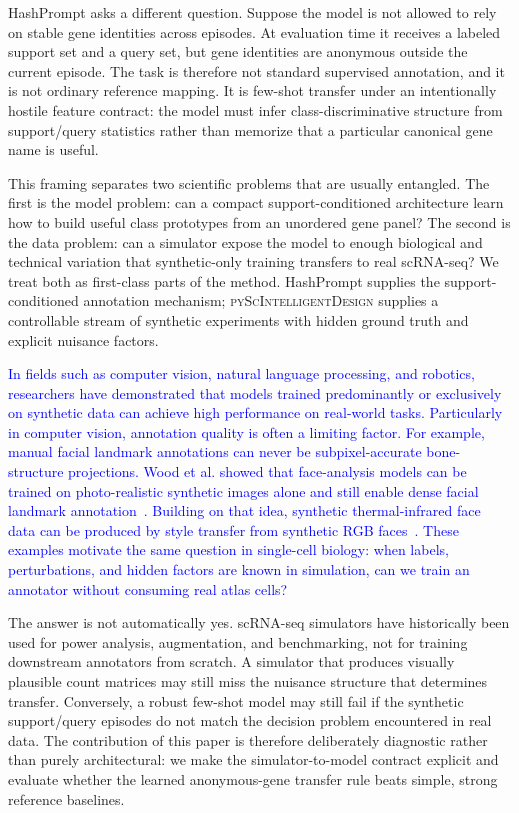 \documentclass{article}
\newcommand{\phflo}[1]{\textcolor{blue}{#1}}
\begin{document}
HashPrompt asks a different question. Suppose the model is not allowed to rely on stable gene identities across episodes. At evaluation time it receives a labeled support set and a query set, but gene identities are anonymous outside the current episode. The task is therefore not standard supervised annotation, and it is not ordinary reference mapping. It is few-shot transfer under an intentionally hostile feature contract: the model must infer class-discriminative structure from support/query statistics rather than memorize that a particular canonical gene name is useful.

This framing separates two scientific problems that are usually entangled. The first is the model problem: can a compact support-conditioned architecture learn how to build useful class prototypes from an unordered gene panel? The second is the data problem: can a simulator expose the model to enough biological and technical variation that synthetic-only training transfers to real scRNA-seq? We treat both as first-class parts of the method. HashPrompt supplies the support-conditioned annotation mechanism; \textsc{pyScIntelligentDesign} supplies a controllable stream of synthetic experiments with hidden ground truth and explicit nuisance factors.

\phflo{In fields such as computer vision, natural language processing, and robotics, researchers have demonstrated that models trained predominantly or exclusively on synthetic data can achieve high performance on real-world tasks. Particularly in computer vision, annotation quality is often a limiting factor. For example, manual facial landmark annotations can never be subpixel-accurate bone-structure projections. Wood et al. showed that face-analysis models can be trained on photo-realistic synthetic images alone and still enable dense facial landmark annotation~\cite{wood2021fake}. Building on that idea, synthetic thermal-infrared face data can be produced by style transfer from synthetic RGB faces~\cite{flotho2024t}. These examples motivate the same question in single-cell biology: when labels, perturbations, and hidden factors are known in simulation, can we train an annotator without consuming real atlas cells?}

The answer is not automatically yes. scRNA-seq simulators have historically been used for power analysis, augmentation, and benchmarking, not for training downstream annotators from scratch. A simulator that produces visually plausible count matrices may still miss the nuisance structure that determines transfer. Conversely, a robust few-shot model may still fail if the synthetic support/query episodes do not match the decision problem encountered in real data. The contribution of this paper is therefore deliberately diagnostic rather than purely architectural: we make the simulator-to-model contract explicit and evaluate whether the learned anonymous-gene transfer rule beats simple, strong reference baselines.
\end{document}
